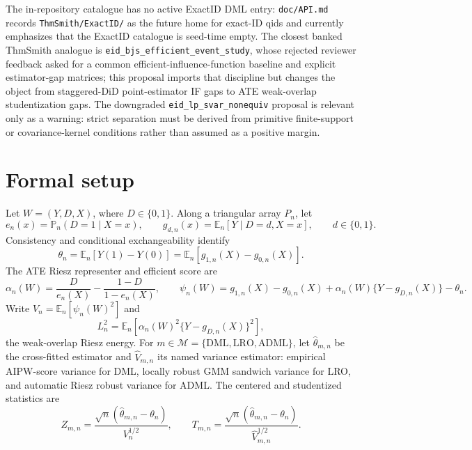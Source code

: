 \documentclass[11pt]{article}
\newcommand{\E}{\mathbb{E}}
\renewcommand{\Pr}{\mathbb{P}}
\theoremstyle{definition}
\theoremstyle{plain}
\theoremstyle{remark}
\begin{document}
The in-repository catalogue has no active ExactID DML entry: \texttt{doc/API.md} records \texttt{ThmSmith/ExactID/} as the future home for exact-ID qids and currently emphasizes that the ExactID catalogue is seed-time empty.  The closest banked ThmSmith analogue is \texttt{eid\_bjs\_efficient\_event\_study}, whose rejected reviewer feedback asked for a common efficient-influence-function baseline and explicit estimator-gap matrices; this proposal imports that discipline but changes the object from staggered-DiD point-estimator IF gaps to ATE weak-overlap studentization gaps.  The downgraded \texttt{eid\_lp\_svar\_nonequiv} proposal is relevant only as a warning: strict separation must be derived from primitive finite-support or covariance-kernel conditions rather than assumed as a positive margin.

\section{Formal setup}
Let \(W=(Y,D,X)\), where \(D\in\{0,1\}\).  Along a triangular array \(P_n\), let
\[
  e_n(x)=\Pr_n(D=1\mid X=x),\qquad
  g_{d,n}(x)=\E_n[Y\mid D=d,X=x],\qquad d\in\{0,1\}.
\]
Consistency and conditional exchangeability identify
\[
  \theta_n=\E_n[Y(1)-Y(0)]
  =\E_n[g_{1,n}(X)-g_{0,n}(X)].
\]
The ATE Riesz representer and efficient score are
\[
  \alpha_n(W)=\frac{D}{e_n(X)}-\frac{1-D}{1-e_n(X)},\qquad
  \psi_n(W)=g_{1,n}(X)-g_{0,n}(X)+\alpha_n(W)\{Y-g_{D,n}(X)\}-\theta_n.
\]
Write \(V_n=\E_n[\psi_n(W)^2]\) and
\[
  L_n^2=\E_n\!\left[\alpha_n(W)^2\{Y-g_{D,n}(X)\}^2\right],
\]
the weak-overlap Riesz energy.  For \(m\in\mathcal M=\{\mathrm{DML},\mathrm{LRO},\mathrm{ADML}\}\), let \(\hat\theta_{m,n}\) be the cross-fitted estimator and \(\hat V_{m,n}\) its named variance estimator: empirical AIPW-score variance for DML, locally robust GMM sandwich variance for LRO, and automatic Riesz robust variance for ADML.  The centered and studentized statistics are
\[
  Z_{m,n}=\frac{\sqrt n(\hat\theta_{m,n}-\theta_n)}{V_n^{1/2}},
  \qquad
  T_{m,n}=\frac{\sqrt n(\hat\theta_{m,n}-\theta_n)}{\hat V_{m,n}^{1/2}}.
\]
\end{document}
